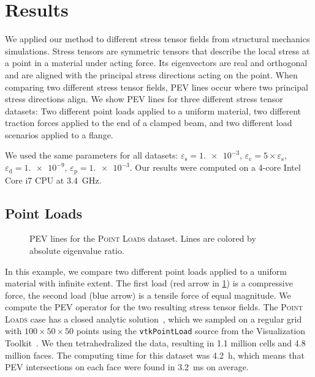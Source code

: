 

\section{Results} %
\label{sec:pev_results}
%
We applied our method to different stress tensor fields from structural
mechanics simulations.
%
Stress tensors are symmetric tensors that describe the local stress at a point
in a material under acting force.
%
Its eigenvectors are real and orthogonal and are aligned with the principal
stress directions acting on the point.
%
When comparing two different stress tensor fields, \ac{PEV} lines occur where two
principal stress directions align.
%
We show \ac{PEV} lines for three different stress tensor datasets:
%
Two different point loads applied to a uniform material, two different traction
forces applied to the end of a clamped beam, and two different load scenarios
applied to a flange.
%

%
We used the same parameters for all datasets:
%
$\varepsilon_\mathrm{s} = \num{1.e-3}$, $\varepsilon_\mathrm{c} = 5 \times
\varepsilon_\mathrm{s}$, $\varepsilon_\mathrm{d} = \num{1.e-9}$,
$\varepsilon_\mathrm{p} = \num{1.e-3}$.
%
Our results were computed on a 4-core Intel Core i7 \ac{CPU} at
\SI{3.4}{\giga\hertz}.
%
\subsection{Point Loads} %
\label{ssub:point_loads}
%
\begin{figure}[t]
    \setlength\figurewidth\textwidth
    \centering
    
    \vspace*{-5mm}
    \caption{\ac{PEV} lines for the \textsc{Point Loads} dataset. Lines are
             colored by absolute eigenvalue ratio.}
    \label{fig:point_load}
\end{figure}
%
In this example, we compare two different point loads applied to a uniform
material with infinite extent.
%
The first load (red arrow in \cref{fig:point_load}) is a compressive force,
the second load (blue arrow) is a tensile force of equal magnitude.
%
We compute the \ac{PEV} operator for the two resulting stress tensor fields.
%
The \textsc{Point Loads} case has a closed analytic solution~\cite{Saada2013},
which we sampled on a regular grid with $\num{100} \times \num{50} \times
\num{50}$ points using the \texttt{vtkPointLoad} source from the Visualization
Toolkit~\cite{Schroeder2006}.
%
We then tetrahedralized the data, resulting in \num{1.1} million cells and
\num{4.8} million faces.
%
The computing time for this dataset was \SI{4.2}{\hour}, which means that \ac{PEV}
intersections on each face were found in \SI{3.2}{\milli\second} on average.
%

